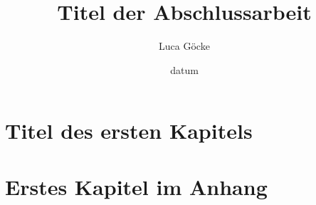 \documentclass[pstricks,siunitx,theorem,british]{tumphthesis}
\title{Titel der Abschlussarbeit}
\author{Luca Göcke}
\date{datum}
\begin{document}

\frontmatter
\maketitle
\tableofcontents


\mainmatter
\chapter{Titel des ersten Kapitels}








\appendix
\chapter{Erstes Kapitel im Anhang}

\backmatter
\printbibliography
\end{document}
